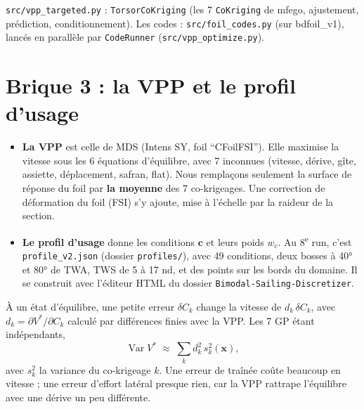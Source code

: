 \documentclass[11pt,a4paper]{article}
\newcommand{\vx}{\bm{x}}
\newcommand{\vc}{\bm{c}}
\newcommand{\py}[1]{\texttt{#1}}
\DeclareMathOperator{\Var}{Var}
\begin{document}
\begin{danslecode}
\py{src/vpp\_targeted.py} : \py{TorsorCoKriging} (les 7 \py{CoKriging} de mfego, ajustement, prédiction,
conditionnement). Les codes : \py{src/foil\_codes.py} (sur bdfoil\_v1), lancés en parallèle par
\py{CodeRunner} (\py{src/vpp\_optimize.py}).
\end{danslecode}

\section{Brique 3 : la VPP et le profil d'usage}
\begin{itemize}
  \item \textbf{La VPP} est celle de MDS (Intens SY, foil \enquote{CFoilFSI}). Elle maximise la vitesse sous les
        6 équations d'équilibre, avec 7 inconnues (vitesse, dérive, gîte, assiette, déplacement, safran,
        flat). Nous remplaçons seulement la surface de réponse du foil par \textbf{la moyenne} des 7
        co-krigeages. Une correction de déformation du foil (FSI) s'y ajoute, mise à l'échelle par la raideur
        de la section.
  \item \textbf{Le profil d'usage} donne les conditions $\vc$ et leurs poids $w_c$. Au
        8\textsuperscript{e} run, c'est \py{profile\_v2.json} (dossier \py{profiles/}), avec 49 conditions, deux bosses à 40° et 80° de TWA, TWS de 5 à
        17 nd, et des points sur les bords du domaine. Il se construit avec l'éditeur HTML du dossier
        \py{Bimodal-Sailing-Discretizer}.
\end{itemize}

\begin{theorie}
À un état d'équilibre, une petite erreur $\delta C_k$ change la vitesse de $d_k\,\delta C_k$, avec
$d_k=\partial V^\ast/\partial C_k$ calculé par différences finies avec la VPP. Les 7 GP étant indépendants,
\[
\Var V^\ast\;\approx\;\sum_{k} d_k^2\,s_k^2(\vx),
\]
avec $s_k^2$ la variance du co-krigeage $k$. Une erreur de traînée coûte beaucoup en vitesse ; une erreur
d'effort latéral presque rien, car la VPP rattrape l'équilibre avec une dérive un peu différente.
\end{theorie}
\end{document}
